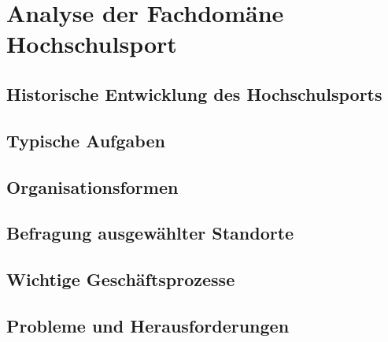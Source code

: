 \section{Analyse der Fachdomäne Hochschulsport} 
\label{ch:hochschulsport} 

\subsection{Historische Entwicklung des Hochschulsports}
\subsection{Typische Aufgaben}
\subsection{Organisationsformen}
\subsection{Befragung ausgewählter Standorte}
\subsection{Wichtige Geschäftsprozesse}
\subsection{Probleme und Herausforderungen}